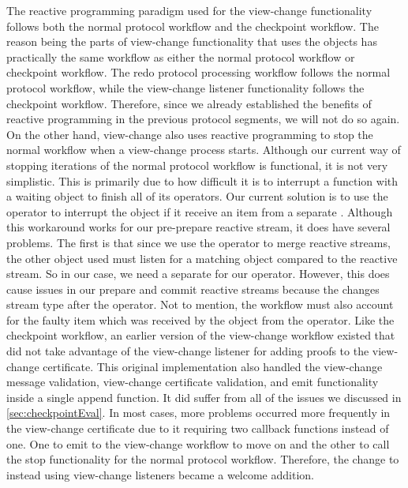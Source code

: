 The reactive programming paradigm used for the view-change functionality follows both the normal protocol workflow and the checkpoint workflow. The reason being the parts of view-change functionality that uses the  objects has practically the same workflow as either the normal protocol workflow or checkpoint workflow. The redo protocol processing workflow follows the normal protocol workflow, while the view-change listener functionality follows the checkpoint workflow. Therefore, since we already established the benefits of reactive programming in the previous protocol segments, we will not do so again. On the other hand, view-change also uses reactive programming to stop the normal workflow when a view-change process starts. Although our current way of stopping iterations of the normal protocol workflow is functional, it is not very simplistic.  This is primarily due to how difficult it is to interrupt a function with a waiting  object to finish all of its operators. Our current solution is to use the  operator to interrupt the  object if it receive an item from a separate . Although this workaround works for our pre-prepare reactive stream, it does have several problems. The first is that since we use the  operator to merge reactive streams, the other  object used must listen for a matching object compared to the reactive stream. So in our case, we need a separate  for our  operator. However, this does cause issues in our prepare and commit reactive streams because the changes stream type after the  operator. Not to mention, the workflow must also account for the faulty item which was received by the  object from the  operator. Like the checkpoint workflow, an earlier version of the view-change workflow existed that did not take advantage of the view-change listener for adding proofs to the view-change certificate. This original implementation also handled the view-change message validation, view-change certificate validation, and emit functionality inside a single append function. It did suffer from all of the issues we discussed in \autoref{sec:checkpointEval}. In most cases, more problems occurred more frequently in the view-change certificate due to it requiring two callback functions instead of one. One to emit to the view-change workflow to move on and the other to call the stop functionality for the normal protocol workflow. Therefore, the change to instead using view-change listeners became a welcome addition.